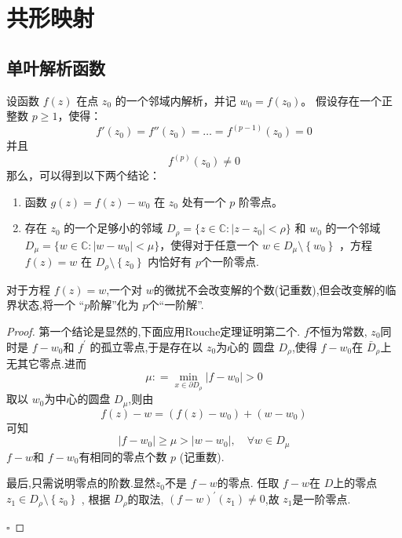 \documentclass[../../复变函数.tex]{subfiles}
\begin{document}
\chapter{共形映射}

\section{单叶解析函数}
\begin{lemma}
    设函数 $f(z)$ 在点 $z_0$ 的一个邻域内解析，并记 $w_0 = f(z_0)$。
假设存在一个正整数 $p \ge 1$，使得：
$$f'(z_0) = f''(z_0) = \dots = f^{(p-1)}(z_0) = 0$$
并且
$$f^{(p)}(z_0) \neq 0$$
那么，可以得到以下两个结论：
\begin{enumerate}
    \item 函数 $g(z) = f(z) - w_0$ 在 $z_0$ 处有一个 $p$ 阶零点。
    \item 存在 $z_0$ 的一个足够小的邻域 $D_{\rho} = \{z \in \mathbb{C} : |z-z_0| < \rho\}$ 和 $w_0$ 的一个邻域 $D_{\mu} = \{w \in \mathbb{C} : |w-w_0| < \mu\}$，使得对于任意一个 $w \in D_{\mu}\setminus \left\{ w_0 \right\}$ ，方程 $f(z) = w$ 在 $D_{\rho }\setminus \left\{ z_0 \right\}$ 内恰好有 \(  p  \)个一阶零点. 
\end{enumerate}
\end{lemma}
\begin{note}
     对于方程 \(  f\left( z \right)= w   \),一个对 \(  w  \)的微扰不会改变解的个数(记重数),但会改变解的临界状态,将一个 “\(  p  \)阶解”化为  \(  p  \)个“一阶解”.
\end{note}
\begin{proof}
    第一个结论是显然的,下面应用Rouche定理证明第二个.
    \(  f  \)不恒为常数, \(  z_0  \)同时是 \(  f-w_0  \)和 \(  f^{\prime}   \) 的孤立零点,于是存在以 \(  z_0  \)为心的 圆盘 \(  D_{\rho }  \),使得  \(  f-w_0  \)在 \(  \bar{D}_{\rho }  \)上无其它零点.进而 \[
    \mu : = \min _{x \in  \partial D_{\rho }}\left| f-w_0 \right|> 0 
    \]取以 \(  w_0  \)为中心的圆盘 \(  D_{\mu }  \),则由  
     \[
     f\left( z \right)-w= \left( f\left( z \right)-w_0  \right)+ \left( w-w_0 \right)   
     \]可知 \[
     \left| f-w_0 \right|\ge \mu > \left| w-w_0 \right|,\quad \forall w \in D_{\mu }  
     \] \(  f-w  \)和 \(  f-w_0  \)有相同的零点个数 \(  p  \) (记重数).
     
     最后,只需说明零点的阶数.显然\(  z_0  \)不是 \(  f-w  \)的零点.  任取 \(  f-w  \)在 \(  D  \)上的零点\(  z_1 \in D_{\rho }\setminus \left\{ z_0 \right\} \) ,  根据 \(  D_{\rho }  \)的取法, \(\left( f-w \right)^{\prime} \left( z_1 \right)\neq 0    \),故  \(  z_1  \)是一阶零点. 

    \hfill $\square$
\end{proof}
\end{document}
